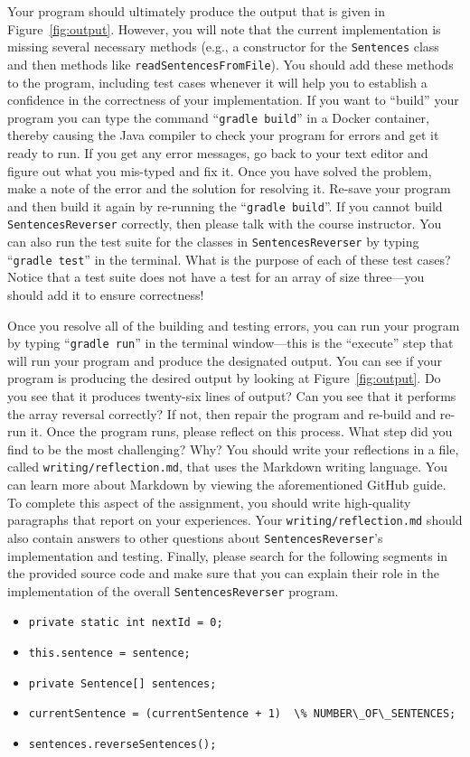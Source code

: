\documentclass[11pt]{article}
\newcommand{\mainprogram}{\lstinline{SentencesReverser}}
\newcommand{\reflection}{\lstinline{writing/reflection.md}}
\newcommand{\gradlebuild}{\command{gradle build}}
\newcommand{\gradletest}{\command{gradle test}}
\newcommand{\gradlerun}{\command{gradle run}}
\newcommand{\command}[1]{``\lstinline{#1}''}
\newcommand{\program}[1]{\lstinline{#1}}
\newcommand{\step}[1]{``{#1}''}
\begin{document}
Your program should ultimately produce the output that is given in
Figure~\ref{fig:output}. However, you will note that the current implementation
is missing several necessary methods (e.g., a constructor for the
\program{Sentences} class and then methods like
\program{readSentencesFromFile}). You should add these methods to the program,
including test cases whenever it will help you to establish a confidence in the
correctness of your implementation. If you want to \step{build} your program you
can type the command \gradlebuild{} in a Docker container, thereby causing the
Java compiler to check your program for errors and get it ready to run. If you
get any error messages, go back to your text editor and figure out what you
mis-typed and fix it. Once you have solved the problem, make a note of the error
and the solution for resolving it. Re-save your program and then build it again
by re-running the \gradlebuild{}. If you cannot build \mainprogram{} correctly,
then please talk with the course instructor. You can also run the test suite for
the classes in \mainprogram{} by typing \gradletest{} in the terminal. What is
the purpose of each of these test cases? Notice that a test suite does not have
a test for an array of size three---you should add it to ensure correctness!

Once you resolve all of the building and testing errors, you can run your
program by typing \gradlerun{} in the terminal window---this is the ``execute''
step that will run your program and produce the designated output. You can see
if your program is producing the desired output by looking at
Figure~\ref{fig:output}. Do you see that it produces twenty-six lines of output?
Can you see that it performs the array reversal correctly? If not, then repair
the program and re-build and re-run it. Once the program runs, please reflect on
this process. What step did you find to be the most challenging? Why? You should
write your reflections in a file, called \reflection{}, that uses the Markdown
writing language. You can learn more about Markdown by viewing the
aforementioned GitHub guide. To complete this aspect of the assignment, you
should write high-quality paragraphs that report on your experiences. Your
\reflection{} should also contain answers to other questions about
\mainprogram{}'s implementation and testing. Finally, please search for the
following segments in the provided source code and make sure that you can
explain their role in the implementation of the overall \mainprogram{} program.

\begin{itemize}

  \item \program{private static int nextId = 0;}
  \item \program{this.sentence = sentence;}
  \item \program{private Sentence[] sentences;}
  \item \program{currentSentence = (currentSentence + 1)  \% NUMBER\_OF\_SENTENCES;}
  \item \program{sentences.reverseSentences();}

\end{itemize}
\end{document}
